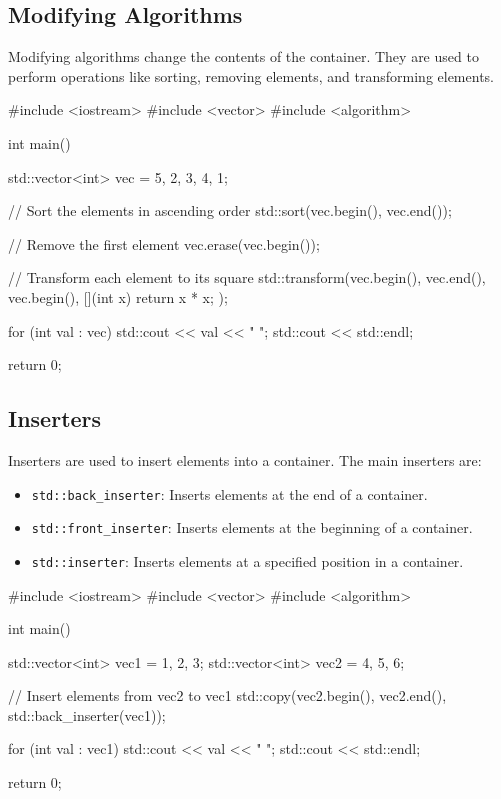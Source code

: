 \subsection{Modifying Algorithms}

Modifying algorithms change the contents of the container. They are used to perform operations like sorting, removing elements, and transforming elements.

\begin{exampleblock}
\begin{codeblock}[language=C++]
#include <iostream>
#include <vector>
#include <algorithm>

int main() {
    std::vector<int> vec = {5, 2, 3, 4, 1};

    // Sort the elements in ascending order
    std::sort(vec.begin(), vec.end());

    // Remove the first element
    vec.erase(vec.begin());

    // Transform each element to its square
    std::transform(vec.begin(), vec.end(), vec.begin(), [](int x) { return x * x; });

    for (int val : vec) {
        std::cout << val << " ";
    }
    std::cout << std::endl;

    return 0;
}
\end{codeblock}
\end{exampleblock}

\subsection{Inserters}

Inserters are used to insert elements into a container. The main inserters are:
\begin{itemize}
    \item \texttt{std::back\_inserter}: Inserts elements at the end of a container.
    \item \texttt{std::front\_inserter}: Inserts elements at the beginning of a container.
    \item \texttt{std::inserter}: Inserts elements at a specified position in a container.
\end{itemize}

\begin{exampleblock}
\begin{codeblock}[language=C++]
#include <iostream>
#include <vector>
#include <algorithm>

int main() {
    std::vector<int> vec1 = {1, 2, 3};
    std::vector<int> vec2 = {4, 5, 6};

    // Insert elements from vec2 to vec1
    std::copy(vec2.begin(), vec2.end(), std::back_inserter(vec1));

    for (int val : vec1) {
        std::cout << val << " ";
    }
    std::cout << std::endl;

    return 0;
}
\end{codeblock}
\end{exampleblock}


